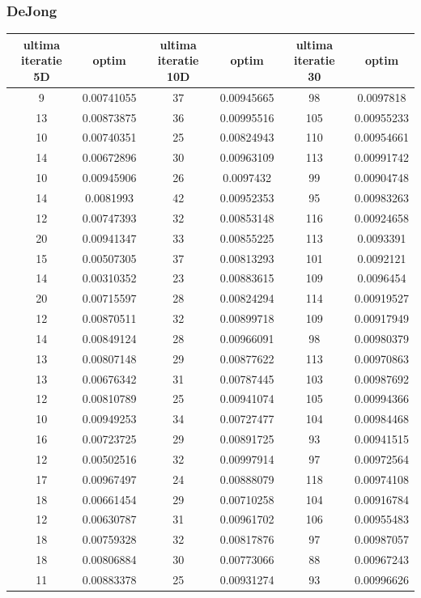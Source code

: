 \documentclass{article}
\begin{document}
\subsubsection{DeJong}
\begin{tabular}{cccccc}
\hline
ultima iteratie 5D& optim&ultima iteratie 10D& optim&ultima iteratie 30&optim\\
\hline
9&0.00741055&37&0.00945665&98&0.0097818 \\ \hline
13&0.00873875&36&0.00995516&105&0.00955233 \\ \hline
10&0.00740351&25&0.00824943&110&0.00954661 \\ \hline
14&0.00672896&30&0.00963109&113&0.00991742 \\ \hline
10&0.00945906&26&0.0097432&99&0.00904748 \\ \hline
14&0.0081993&42&0.00952353&95&0.00983263 \\ \hline
12&0.00747393&32&0.00853148&116&0.00924658 \\ \hline
20&0.00941347&33&0.00855225&113&0.0093391 \\ \hline
15&0.00507305&37&0.00813293&101&0.0092121 \\ \hline
14&0.00310352&23&0.00883615&109&0.0096454 \\ \hline
20&0.00715597&28&0.00824294&114&0.00919527 \\ \hline
12&0.00870511&32&0.00899718&109&0.00917949 \\ \hline
14&0.00849124&28&0.00966091&98&0.00980379 \\ \hline
13&0.00807148&29&0.00877622&113&0.00970863 \\ \hline
13&0.00676342&31&0.00787445&103&0.00987692 \\ \hline
12&0.00810789&25&0.00941074&105&0.00994366 \\ \hline
10&0.00949253&34&0.00727477&104&0.00984468 \\ \hline
16&0.00723725&29&0.00891725&93&0.00941515 \\ \hline
12&0.00502516&32&0.00997914&97&0.00972564 \\ \hline
17&0.00967497&24&0.00888079&118&0.00974108 \\ \hline
18&0.00661454&29&0.00710258&104&0.00916784 \\ \hline
12&0.00630787&31&0.00961702&106&0.00955483 \\ \hline
18&0.00759328&32&0.00817876&97&0.00987057 \\ \hline
18&0.00806884&30&0.00773066&88&0.00967243 \\ \hline
11&0.00883378&25&0.00931274&93&0.00996626 \\ \hline

\end{tabular}
\end{document}
